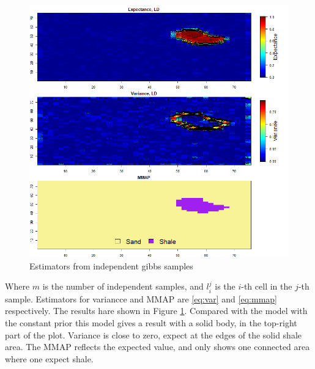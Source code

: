 \documentclass{article}
\begin{document}
\begin{figure}[h]	
	\begin{center} 
		\includegraphics[scale=0.75]{c4.png}
	\end{center}
	\caption{Estimators from independent gibbs samples}
	\label{fig:c4} 
\end{figure}


Where $m$ is the number of independent samples, and $l_i^j$ is the $i$-th cell in the $j$-th sample.
Estimators for variancce and MMAP are \eqref{eq:var} and \eqref{eq:mmap} respectively.  The results hare shown in Figure \ref{fig:c4}. 
Compared with the model with the constant prior this model gives a result with a solid body, in the top-right part of the plot. Variance is close to zero, expect at the edges of the solid shale area. The MMAP reflects the expected value, and only shows one connected area where one expect shale. 
\end{document}
